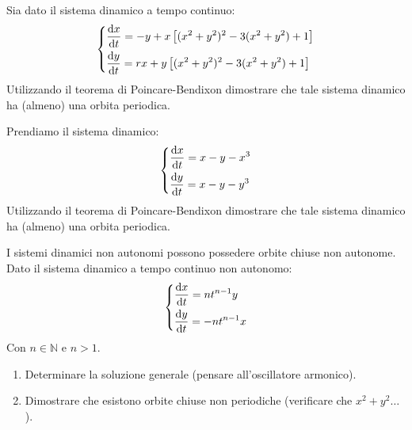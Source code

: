 \begin{ex}[]
    Sia dato il sistema dinamico a tempo continuo:
    \[
    \begin{dcases}
	\frac{\text{d} x}{\text{d} t} = -y + x\left[(x^2+y^2) ^2 - 3 (x^2+y^2) + 1\right]\\
	\frac{\text{d} y}{\text{d} t} = rx + y\left[(x^2+y^2) ^2 - 3 (x^2+y^2) + 1\right]
    \end{dcases}
    \]
    Utilizzando il teorema di Poincare-Bendixon dimostrare che tale sistema dinamico ha (almeno) una orbita periodica.
\end{ex}
\noindent
\begin{ex}[]
    Prendiamo il sistema dinamico:
    \[
    \begin{dcases}
    \frac{\text{d} x}{\text{d} t} = x - y -x^3\\
    \frac{\text{d} y}{\text{d} t} = x - y -y^3\\
    \end{dcases}
    \]
    Utilizzando il teorema di Poincare-Bendixon dimostrare che tale sistema dinamico ha (almeno) una orbita periodica.
\end{ex}
\noindent
\begin{ex}[]
    I sistemi dinamici non autonomi possono possedere orbite chiuse non autonome.\\
    Dato il sistema dinamico a tempo continuo non autonomo:
    \[
    \begin{dcases}
    \frac{\text{d} x}{\text{d} t} = nt^{n-1}y\\
    \frac{\text{d} y}{\text{d} t} = -nt^{n-1}x
    \end{dcases}
    \]
    Con $n\in \mathbb{N}$ e $n>1$.\\
    \begin{enumerate}
	\item Determinare la soluzione generale (pensare all'oscillatore armonico). 
	\item Dimostrare che esistono orbite chiuse non periodiche (verificare che $x^2 + y^2 \ldots$).
    \end{enumerate}
\end{ex}
\noindent
